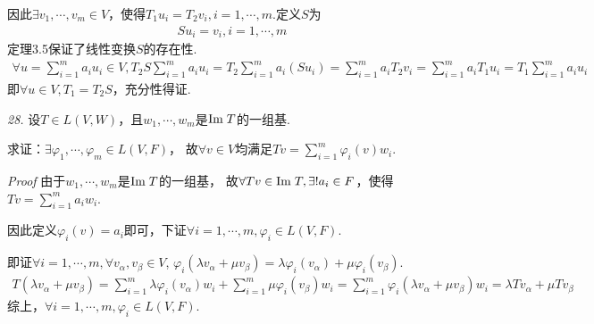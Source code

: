 因此\(\exists v_1,\cdots,v_m \in V\)，使得\(T_1u_i=T_2v_i,i=1,\cdots,m\).定义\(S\)为
    \begin{align*}
        Su_i=v_i,i=1,\cdots,m
    \end{align*}
定理3.5保证了线性变换\(S\)的存在性.
    \begin{align*}
        \forall u=\sum_{i=1}^m a_iu_i \in V,T_2S\sum_{i=1}^m a_iu_i=T_2\sum_{i=1}^m a_i(Su_i)
        =\sum_{i=1}^m a_iT_2v_i=\sum_{i=1}^m a_iT_1u_i=T_1\sum_{i=1}^m a_iu_i
    \end{align*}
即\(\forall u \in V , T_1=T_2S\)，充分性得证.

\hspace*{\fill}

    \begin{comment}
        \textit{26.}
        设\(D \in L(P(R))\)对于其中任意的多项式\(p\)满足\(\mydeg Dp=\mydeg p-1\).

        求证：\(D\)是满射变换.

        \textit{Proof}
        根据\textit{3.B.10}，命题等价于
            \begin{align*}
                \myspan (D(x),D(x^2),\cdots)=\Img D=P(R)=\myspan (1,x,\cdots)
            \end{align*}
        根据\textit{2.C.10}，由于\(\mydeg Dp=\mydeg p-1\)，

        故\(\myspan (D(x),D(x^2),\cdots)=\myspan (1,x,\cdots)\)成立.
    \end{comment}

\textit{28.}
设\(T \in L(V,W)\)，且\(w_1,\cdots,w_m\)是\(\mathrm{Im \;} T\)的一组基.

求证：\(\exists \varphi_1,\cdots,\varphi_m \in L(V,F)\)，
故\(\forall v \in V\)均满足\(Tv=\sum_{i=1}^m{\varphi_i(v)w_i}\).

\textit{Proof}
由于\(w_1,\cdots,w_m\)是\(\mathrm{Im \;} T\)的一组基，
故\(\forall Tv \in \mathrm{Im \;} T,\exists! a_i \in F\)，使得\(Tv=\sum_{i=1}^m a_iw_i\).

因此定义\(\varphi_i(v)=a_i\)即可，下证\(\forall i=1,\cdots,m,\varphi_i \in L(V,F)\).

即证\(\forall i=1,\cdots,m,\forall v_\alpha,v_\beta \in V\),
\(\varphi_i(\lambda v_\alpha+\mu v_\beta)=\lambda \varphi_i(v_\alpha)+\mu \varphi_i(v_\beta)\).
    \begin{align*}
        T(\lambda v_\alpha+\mu v_\beta)=\sum_{i=1}^m \lambda \varphi_i(v_\alpha)w_i+\sum_{i=1}^m \mu \varphi_i(v_\beta)w_i
        =\sum_{i=1}^m \varphi_i(\lambda v_\alpha+\mu v_\beta)w_i=\lambda Tv_\alpha+\mu Tv_\beta
    \end{align*}
综上，\(\forall i=1,\cdots,m,\varphi_i \in L(V,F)\).

